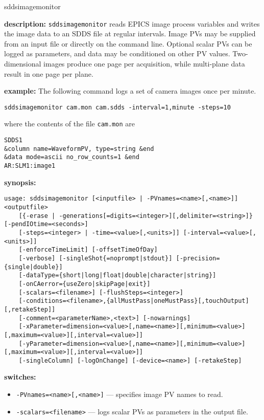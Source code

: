 %
\begin{sddsprog}{sddsimagemonitor}
\item {\bf description:}
\verb+sddsimagemonitor+ reads EPICS image process variables and writes the image
  data to an SDDS file at regular intervals. Image PVs may be supplied from an
  input file or directly on the command line. Optional scalar PVs can be logged as
  parameters, and data may be conditioned on other PV values. Two-dimensional
  images produce one page per acquisition, while multi-plane data result in one
  page per plane.
\item {\bf example:}
The following command logs a set of camera images once per minute.
\begin{verbatim}
sddsimagemonitor cam.mon cam.sdds -interval=1,minute -steps=10
\end{verbatim}
where the contents of the file \verb+cam.mon+ are
\begin{verbatim}
SDDS1
&column name=WaveformPV, type=string &end
&data mode=ascii no_row_counts=1 &end
AR:SLM1:image1
\end{verbatim}
\item {\bf synopsis:}
\begin{verbatim}
usage: sddsimagemonitor [<inputfile> | -PVnames=<name>[,<name>]] <outputfile>
    [{-erase | -generations[=digits=<integer>][,delimiter=<string>]} [-pendIOtime=<seconds>]
    [-steps=<integer> | -time=<value>[,<units>]] [-interval=<value>[,<units>]]
    [-enforceTimeLimit] [-offsetTimeOfDay]
    [-verbose] [-singleShot{=noprompt|stdout}] [-precision={single|double}]
    [-dataType={short|long|float|double|character|string}]
    [-onCAerror={useZero|skipPage|exit}]
    [-scalars=<filename>] [-flushSteps=<integer>]
    [-conditions=<filename>,{allMustPass|oneMustPass}[,touchOutput][,retakeStep]]
    [-comment=<parameterName>,<text>] [-nowarnings]
    [-xParameter=dimension=<value>[,name=<name>][,minimum=<value>][,maximum=<value>][,interval=<value>]]
    [-yParameter=dimension=<value>[,name=<name>][,minimum=<value>][,maximum=<value>][,interval=<value>]]
    [-singleColumn] [-logOnChange] [-device=<name>] [-retakeStep]
\end{verbatim}
\item {\bf switches:}
  \begin{itemize}
  \item {\verb+-PVnames=<name>[,<name>]+} --- specifies image PV names to read.
  \item {\verb+-scalars=<filename>+} --- logs scalar PVs as parameters in the output file.

\end{itemize}
\end{sddsprog}
